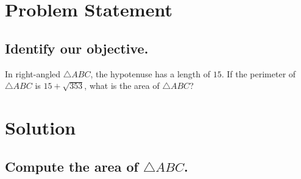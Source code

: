 \documentclass{beamer} %
\begin{document}
\begin{frame} %
  \titlepage
\end{frame}

\section{Problem Statement}

\subsection*{Identify our objective.}

\begin{frame}
  In right-angled $\triangle ABC$, the hypotenuse has a length of $15$. If the perimeter of $\triangle ABC$ is $15 + \sqrt{353}$, what is the area of $\triangle ABC$?
\end{frame}

\section{Solution}

\subsection*{Compute the area of $\triangle ABC$.}

\begin{comment}
\begin{frame}
  \begin{center}
    \begin{tikzpicture}[scale=0.5]
      \draw (0,4.46971821313) node [above left] {$A$};
      \draw (0,0) node [below left] {$B$};
      \draw (14.3185760149,0) node [right] {$C$};
      \draw (0,0) -- (0,4.46971821313);
      \draw (0,0) -- (14.3185760149,0);
      \draw (0,4.46971821313) -- (14.3185760149,0) node [midway,above] {$15$};
      \coordinate (A) at (0,4.46971821313);
      \coordinate (B) at (0,0);
      \coordinate (C) at (14.3185760149,0);
      \tkzMarkRightAngle(A,B,C)
    \end{tikzpicture}
  \end{center}
  \[
    AB + BC = \sqrt{353}
  \]
  \[
    AB^2 + BC^2 = AC^2 = 15^2 = 225
  \]
  \[
    (AB+BC)^2 = AB^2 + BC^2 + 2\cdot AB\cdot BC = 225 + 2\cdot AB\cdot BC = 353
  \]
  \[
    \implies 2\cdot AB\cdot BC = 128 \implies AB\cdot BC = 64
  \]
  \[
    \text{Area of }\triangle ABC = \frac{1}{2}\cdot AB \cdot BC = \frac{1}{2} \cdot 64 = \boxed{32}
  \]
\end{frame}
\end{comment}
\end{document}
